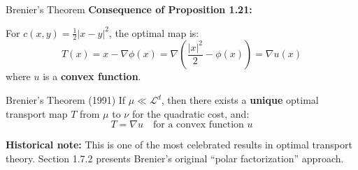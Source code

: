\documentclass[aspectratio=169]{beamer}
\newcommand{\Ld}{\mathcal{L}^d}
\begin{document}
\begin{frame}{Brenier's Theorem}
\textbf{Consequence of Proposition 1.21:}

For $c(x,y) = \frac{1}{2}|x-y|^2$, the optimal map is:
\[
T(x) = x - \nabla\phi(x) = \nabla\left(\frac{|x|^2}{2} - \phi(x)\right) = \nabla u(x)
\]
where $u$ is a \textbf{convex function}.

\vspace{0.3cm}
\begin{block}{Brenier's Theorem (1991)}
If $\mu \ll \Ld$, then there exists a \textbf{unique} optimal transport map $T$ from $\mu$ to $\nu$ for the quadratic cost, and:
\[
\boxed{T = \nabla u \quad \text{for a convex function } u}
\]
\end{block}

\vspace{0.3cm}
\textbf{Historical note:} This is one of the most celebrated results in optimal transport theory. Section 1.7.2 presents Brenier's original ``polar factorization'' approach.
\end{frame}
\end{document}
